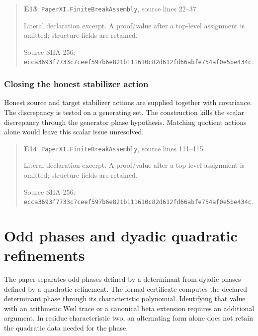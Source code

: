 \documentclass[10pt,oneside]{book}
\begin{document}
\begin{quote}\footnotesize\textbf{E13}: \nolinkurl{PaperXI.FiniteBreakAssembly}, source lines 22--37.\par Literal declaration excerpt. A proof/value after a top-level assignment is omitted; structure fields are retained.\par Source SHA-256: {\scriptsize\texttt{ecca3693f7733c7ceef597b6e821b111610c82d612fd66abfe754af0e5be434c}}.\end{quote}


\subsection{Closing the honest stabilizer action}
\label{guide:E14}
Honest source and target stabilizer actions are supplied together with covariance. The discrepancy is tested on a generating set.
The construction kills the scalar discrepancy through the generator phase hypothesis. Matching quotient actions alone would leave this scalar issue unresolved.

\begin{quote}\footnotesize\textbf{E14}: \nolinkurl{PaperXI.FiniteBreakAssembly}, source lines 111--115.\par Literal declaration excerpt. A proof/value after a top-level assignment is omitted; structure fields are retained.\par Source SHA-256: {\scriptsize\texttt{ecca3693f7733c7ceef597b6e821b111610c82d612fd66abfe754af0e5be434c}}.\end{quote}


\chapter{Odd phases and dyadic quadratic refinements}
The paper separates odd phases defined by a determinant from dyadic phases defined by a quadratic refinement. The formal certificate computes the declared determinant phase through its characteristic polynomial. Identifying that value with an arithmetic Weil trace or a canonical beta extension requires an additional argument. In residue characteristic two, an alternating form alone does not retain the quadratic data needed for the phase.
\end{document}
